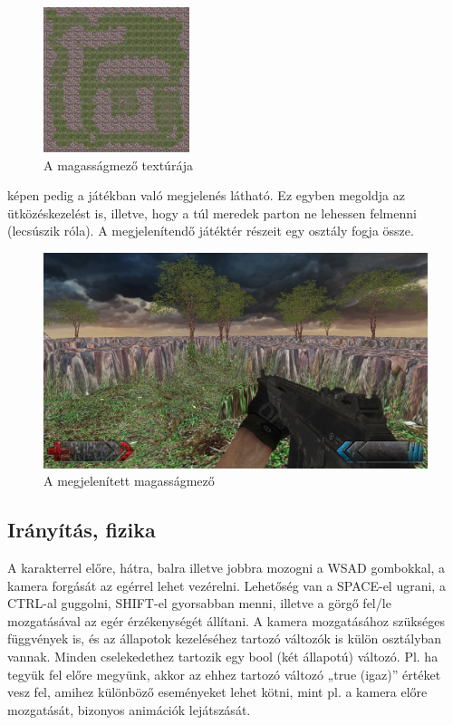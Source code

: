 \begin{figure}[h]
\centering
\includegraphics[scale=0.2]{kepek/heightmap_texture.png}
\caption{A magasságmező textúrája}
\label{fig:heightmap_texture}
\end{figure}

 képen pedig a játékban való megjelenés látható. Ez egyben megoldja az ütközéskezelést is, illetve, hogy a túl meredek parton ne lehessen felmenni (lecsúszik róla). A megjelenítendő játéktér részeit egy osztály fogja össze.

\begin{figure}[h]
\centering
\includegraphics[scale=0.4]{kepek/screenshot.png}
\caption{A megjelenített magasságmező}
\label{fig:screenshot}
\end{figure}

\subsection{Irányítás, fizika}

A karakterrel előre, hátra, balra illetve jobbra mozogni a WSAD gombokkal, a kamera forgását az egérrel lehet vezérelni. Lehetőség van a SPACE-el ugrani, a CTRL-al guggolni, SHIFT-el gyorsabban menni, illetve a görgő fel/le mozgatásával az egér érzékenységét állítani. A kamera mozgatásához szükséges függvények is, és az állapotok kezeléséhez tartozó változók is külön osztályban vannak. Minden cselekedethez tartozik egy bool (két állapotú) változó. Pl. ha tegyük fel előre megyünk, akkor az ehhez tartozó változó „true (igaz)” értéket vesz fel, amihez különböző eseményeket lehet kötni, mint pl. a kamera előre mozgatását, bizonyos animációk lejátszását.

